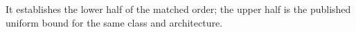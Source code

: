 It establishes the lower half of the matched order; the upper half is the published uniform bound for the same class and architecture.